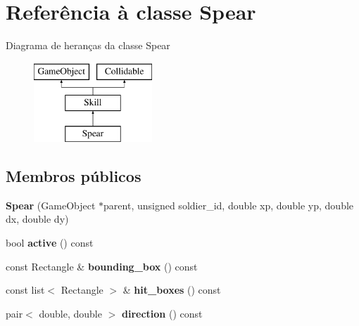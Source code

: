 \hypertarget{classSpear}{}\section{Referência à classe Spear}
\label{classSpear}
Diagrama de heranças da classe Spear\begin{figure}[H]
\begin{center}
\leavevmode
\includegraphics[height=3.000000cm]{classSpear}
\end{center}
\end{figure}
\subsection*{Membros públicos}
\begin{DoxyCompactItemize}
\item 
\mbox{\label{classSpear_a4c5d78dcf2ede1706e020394ef72a2c4}} 
{\bfseries Spear} (Game\+Object $\ast$parent, unsigned soldier\+\_\+id, double xp, double yp, double dx, double dy)
\item 
\mbox{\label{classSpear_aff16da1572b3e683d83c3a9bcfddbd50}} 
bool {\bfseries active} () const
\item 
\mbox{\label{classSpear_a3e10056b0d810137a5df4a4830726f57}} 
const Rectangle \& {\bfseries bounding\+\_\+box} () const
\item 
\mbox{\label{classSpear_ad633d9950ab0bb517d15064126ba5735}} 
const list$<$ Rectangle $>$ \& {\bfseries hit\+\_\+boxes} () const
\item 
\mbox{\label{classSpear_a21feee4e84706b71c1e63f3d9deb1e69}} 
pair$<$ double, double $>$ {\bfseries direction} () const
\end{DoxyCompactItemize}
